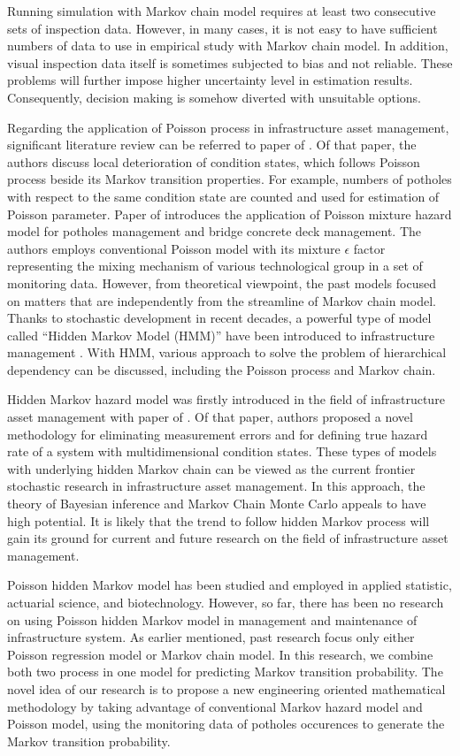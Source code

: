 \documentclass[a4paper,oneside,onecolumn,preprint,10pt,authoryear]{elsarticle}
\begin{document}
Running simulation with Markov chain model requires at least two consecutive sets of inspection data. However, in many cases, it is not easy to have sufficient numbers of data to use in empirical study with Markov chain model. In addition, visual inspection data itself is sometimes subjected to bias and not reliable. These problems will further impose higher uncertainty level in estimation results. Consequently, decision making is somehow diverted with unsuitable options. 

Regarding the application of Poisson process in infrastructure asset management, significant literature review can be referred to paper of \citet{madanatpoisson}. Of that paper, the authors discuss local deterioration of condition states, which follows Poisson process beside its Markov transition properties. For example, numbers of potholes with respect to the same condition state are counted and used for estimation of Poisson parameter. Paper of \citet{Okizukakaito09} introduces the application of Poisson mixture hazard model for potholes management and bridge concrete deck management. The authors employs conventional Poisson model with its mixture $\epsilon$ factor representing the mixing mechanism of various technological group in a set of monitoring data. However, from theoretical viewpoint, the past models focused on matters that are independently from the streamline of Markov chain model. Thanks to stochastic development in recent decades, a powerful type of model called ``Hidden Markov Model (HMM)'' have been introduced to infrastructure management \cite{Kobayashi2009}. With HMM, various approach to solve the problem of hierarchical dependency can be discussed, including the Poisson process and Markov chain.

Hidden Markov hazard model was firstly introduced in the field of infrastructure asset management with paper of \citet{Kobayashi2009}. Of that paper, authors proposed a novel methodology for eliminating measurement errors and for defining true hazard rate of a system with multidimensional condition states. These types of models with underlying hidden Markov chain can be viewed as the current frontier stochastic research in infrastructure asset management. In this approach, the theory of Bayesian inference and Markov Chain Monte Carlo appeals to have high potential. It is likely that the trend to follow hidden Markov process will gain its ground for current and future research on the field of infrastructure asset management.

Poisson hidden Markov model has been studied and employed \citep{paroli2000,Scott00bayesianmethods} in applied statistic, actuarial science, and biotechnology. However, so far, there has been no research on using Poisson hidden Markov model in management and maintenance of infrastructure system. As earlier mentioned, past research focus only either Poisson regression model or Markov chain model. In this research, we combine both two process in one model for predicting Markov transition probability. The novel idea of our research is to propose a new engineering oriented mathematical methodology by taking advantage of conventional Markov hazard model and Poisson model, using the monitoring data of potholes occurences to generate the Markov transition probability.
\end{document}
